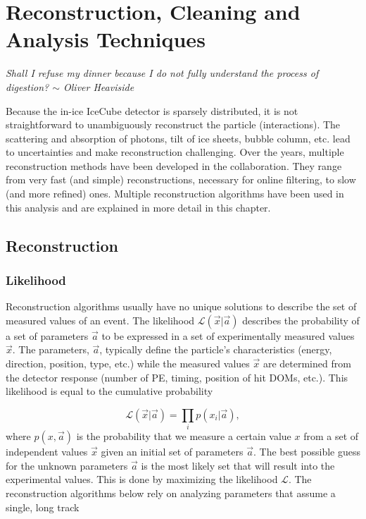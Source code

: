 \chapter{Reconstruction, Cleaning and Analysis Techniques}
\label{ch:reconstruction}
\begin{flushright}
\textit{Shall I refuse my dinner because I do not fully understand the process of digestion? $\sim$ Oliver Heaviside}
\end{flushright}
Because the in-ice IceCube detector is sparsely distributed, it is not straightforward to unambiguously reconstruct the particle (interactions). The scattering and absorption of photons, tilt of ice sheets, bubble column, etc. lead to uncertainties and make reconstruction challenging. Over the years, multiple reconstruction methods have been developed in the collaboration. They range from very fast (and simple) reconstructions, necessary for online filtering, to slow (and more refined) ones. Multiple reconstruction algorithms have been used in this analysis and are explained in more detail in this chapter.

\section{Reconstruction}

\subsection{Likelihood}
Reconstruction algorithms usually have no unique solutions to describe the set of measured values of an event. The likelihood $\mathcal{L}(\vec{x} |\vec{a})$ describes the probability of a set of parameters ${\vec{a}}$ to be expressed in a set of experimentally measured values ${\vec{x}}$. The parameters, ${\vec{a}}$, typically define the particle's characteristics (energy, direction, position, type, etc.) while the measured values ${\vec{x}}$ are determined from the detector response (number of PE, timing, position of hit DOMs, etc.). This likelihood is equal to the cumulative probability

\begin{equation}
\mathcal{L}(\vec{x}|\vec{a}) = \prod_i p(x_i|\vec{a}),
\end{equation}
\noindent where $p(x,\vec{a})$ is the probability that we measure a certain value $x$ from a set of independent values $\vec{x}$ given an initial set of parameters $\vec{a}$. The best possible guess for the unknown parameters $\vec{a}$ is the most likely set that will result into the experimental values. This is done by maximizing the likelihood $\mathcal{L}$. The reconstruction algorithms below rely on analyzing parameters that assume a single, long track

